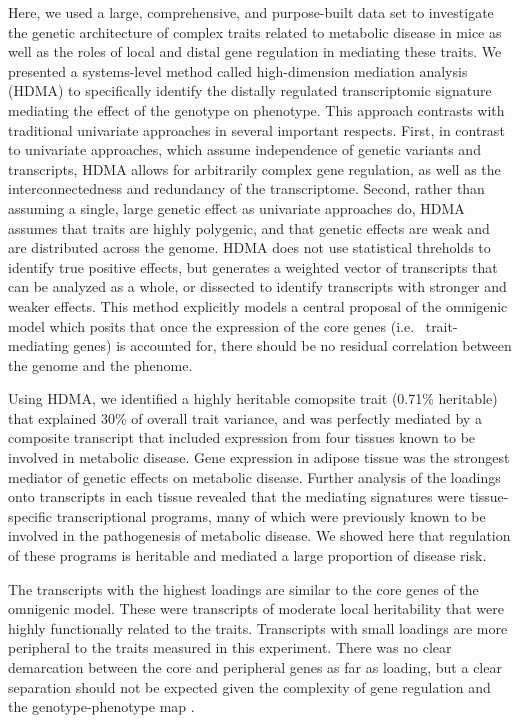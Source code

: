 \documentclass[
]{article}
\begin{document}
Here, we used a large, comprehensive, and purpose-built data set to
investigate the genetic architecture of complex traits related to
metabolic disease in mice as well as the roles of local and distal gene
regulation in mediating these traits. We presented a systems-level
method called high-dimension mediation analysis (HDMA) to specifically
identify the distally regulated transcriptomic signature mediating the
effect of the genotype on phenotype. This approach contrasts with
traditional univariate approaches in several important respects. First,
in contrast to univariate approaches, which assume independence of
genetic variants and transcripts, HDMA allows for arbitrarily complex
gene regulation, as well as the interconnectedness and redundancy of the
transcriptome. Second, rather than assuming a single, large genetic
effect as univariate approaches do, HDMA assumes that traits are highly
polygenic, and that genetic effects are weak and are distributed across
the genome. HDMA does not use statistical threholds to identify true
positive effects, but generates a weighted vector of transcripts that
can be analyzed as a whole, or dissected to identify transcripts with
stronger and weaker effects. This method explicitly models a central
proposal of the omnigenic model which posits that once the expression of
the core genes (i.e.~ trait-mediating genes) is accounted for, there
should be no residual correlation between the genome and the phenome.

Using HDMA, we identified a highly heritable comopsite trait (0.71\%
heritable) that explained 30\% of overall trait variance, and was
perfectly mediated by a composite transcript that included expression
from four tissues known to be involved in metabolic disease. Gene
expression in adipose tissue was the strongest mediator of genetic
effects on metabolic disease. Further analysis of the loadings onto
transcripts in each tissue revealed that the mediating signatures were
tissue-specific transcriptional programs, many of which were previously
known to be involved in the pathogenesis of metabolic disease. We showed
here that regulation of these programs is heritable and mediated a large
proportion of disease risk.

The transcripts with the highest loadings are similar to the core genes
of the omnigenic model. These were transcripts of moderate local
heritability that were highly functionally related to the traits.
Transcripts with small loadings are more peripheral to the traits
measured in this experiment. There was no clear demarcation between the
core and peripheral genes as far as loading, but a clear separation
should not be expected given the complexity of gene regulation and the
genotype-phenotype map \cite{pmid29906445}.
\end{document}
